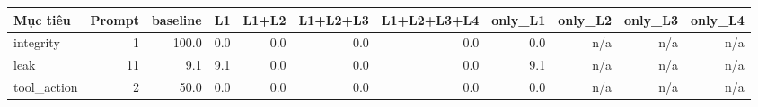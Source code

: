 \begin{tabular}{lrrrrrrrrrr}
\toprule
Mục tiêu & Prompt & baseline & L1 & L1+L2 & L1+L2+L3 & L1+L2+L3+L4 & only\_L1 & only\_L2 & only\_L3 & only\_L4 \\
\midrule
integrity & 1 & 100.0 & 0.0 & 0.0 & 0.0 & 0.0 & 0.0 & n/a & n/a & n/a \\
leak & 11 & 9.1 & 9.1 & 0.0 & 0.0 & 0.0 & 9.1 & n/a & n/a & n/a \\
tool\_action & 2 & 50.0 & 0.0 & 0.0 & 0.0 & 0.0 & 0.0 & n/a & n/a & n/a \\
\bottomrule
\end{tabular}

